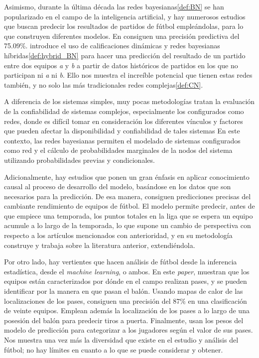 Asimismo, durante la última década las redes bayesianas\ref{def:BN} se han popularizado en el campo 
de la inteligencia artificial, y hay numerosos estudios que buscan predecir los resultados 
de partidos de fútbol empleándolas, para lo que construyen diferentes modelos\cite{prediction-barcelona}.
En \cite{razali-2017} consiguen una precisión predictiva del 75.09\%. \cite{dolores} introduce el uso 
de calificaciones dinámicas\cite{pi-ratings} y redes bayesianas híbridas\ref{def:hybrid_BN} para hacer una predicción del resultado de un 
partido entre dos equipos \textit{a} y \textit{b} a partir de datos históricos de partidos 
en los que no participan ni \textit{a} ni \textit{b}. Ello nos muestra 
el increíble potencial que tienen estas redes también, y no solo las más tradicionales 
redes complejas\ref{def:CN}\cite{caldarelli2007scale}. 

A diferencia de los sistemas simples, muy pocas metodologías tratan la evaluación de la confiabilidad de
sistemas complejos, especialmente los configurados como redes, donde es difícil tomar en
consideración los diferentes vínculos y factores que pueden afectar la disponibilidad y confiabilidad de tales
sistemas En este contexto, las redes bayesianas permiten el
modelado de sistemas configurados como red y el cálculo de probabilidades marginales de la
nodos del sistema utilizando probabilidades previas y condicionales\cite{bn-and-cn}.

Adicionalmente, hay estudios\cite{smart-data} que ponen un gran énfasis 
en aplicar conocimiento causal al proceso de desarrollo del modelo, basándose 
en los datos que son necesarios para la predicción. De esa manera, consiguen predicciones precisas 
del cambiante rendimiento de equipos de fútbol. El modelo permite predecir, antes de que empiece 
una temporada, los puntos totales en la liga que se espera un equipo acumule a lo largo de la temporada, lo 
que supone un cambio de perspectiva con respecto a los artículos mencionados con anterioridad, y en su 
metodología construye y trabaja sobre la literatura anterior, extendiéndola.

Por otro lado, hay vertientes que hacen análisis de fútbol desde la inferencia estadística, desde 
el \textit{machine learning}, o ambos\cite{ML-inference}. En este \textit{paper}, muestran que 
los equipos están caracterizados por dónde en el campo realizan pases, y se 
pueden identificar por la manera en que pasan el balón. Usando mapas de calor de las localizaciones 
de los pases, consiguen una precisión del 87\% en una clasificación de veinte equipos. Emplean 
además la localización de los pases a lo largo de una posesión del balón para predecir tiros a 
puerta. Finalmente, usan los pesos del modelo de predicción para categorizar a los jugadores 
según el valor de sus pases. Nos muestra una vez más la diversidad que existe en el estudio 
y análisis del fútbol; no hay límites en cuanto a lo que se puede considerar y obtener.

